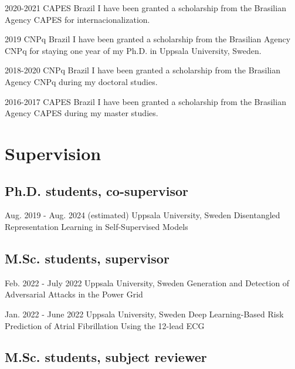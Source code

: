 \documentclass[10pt,letterpaper]{article} %
\begin{document}
    { 2020-2021 }
    { CAPES }
    { Brazil }
    { I have been granted a scholarship from the Brasilian Agency CAPES for internacionalization. }

    { 2019 }
    { CNPq }
    { Brazil }
    { I have been granted a scholarship from the Brasilian Agency CNPq for staying one year of my Ph.D. in Uppsala University, Sweden. }

    { 2018-2020 }
    { CNPq }
    { Brazil }
    { I have been granted a scholarship from the Brasilian Agency CNPq during my doctoral studies. }

    { 2016-2017 }
    { CAPES }
    { Brazil }
    { I have been granted a scholarship from the Brasilian Agency CAPES during my master studies. }


\section*{Supervision}


\subsection*{\noindent Ph.D. students, co-supervisor  }
    
        { Aug. 2019 - Aug. 2024 (estimated) }
        {  }
        { Uppsala University, Sweden }
        { { Disentangled Representation Learning in Self-Supervised Models } }
        

\subsection*{\noindent M.Sc. students, supervisor  }
    
        { Feb. 2022 - July 2022 }
        {  }
        { Uppsala University, Sweden }
        { { Generation and Detection of Adversarial Attacks in the Power Grid } }
        
        { Jan. 2022 - June 2022 }
        {  }
        { Uppsala University, Sweden }
        { { Deep Learning-Based Risk Prediction of Atrial Fibrillation Using the 12-lead ECG } }
        

\subsection*{\noindent M.Sc. students, subject reviewer  }
    
\end{document}
